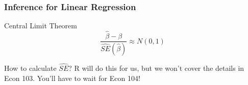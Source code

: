 \begin{frame}
\frametitle{Inference for Linear Regression}
	\begin{block}{Central Limit Theorem}
		$$\frac{\widehat{\beta} - \beta}{\widehat{SE}(\widehat{\beta})} \approx N(0,1)$$ 
\end{block}

\begin{block}{How to calculate $\widehat{SE}$?}
  R will do this for us, but we won't cover the details in Econ 103. 
  You'll have to wait for Econ 104!
\end{block}
%

\end{frame}
%
%

%
%
%

